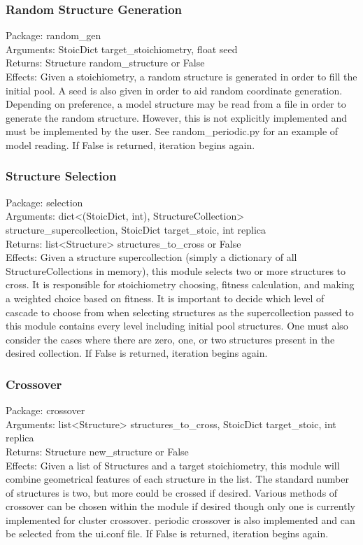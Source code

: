 		\subsubsection{Random Structure Generation} \vspace{-\baselineskip}
		Package: random\_gen\\
		Arguments: StoicDict target\_stoichiometry, float seed\\
		Returns: Structure random\_structure or False\\
		Effects: Given a stoichiometry, a random structure is generated in order to fill the initial pool. A seed is also given in order to aid random coordinate generation. Depending on preference, a model structure may be read from a file in order to generate the random structure. However, this is not explicitly implemented and must be implemented by the user. See random\_periodic.py for an example of model reading. If False is returned, iteration begins again.

		\subsubsection{Structure Selection} \vspace{-\baselineskip}
		Package: selection\\
		Arguments: dict<(StoicDict, int), StructureCollection> structure\_supercollection, StoicDict target\_stoic, int replica\\
		Returns: list<Structure> structures\_to\_cross or False\\
		Effects: Given a structure supercollection (simply a dictionary of all StructureCollections in memory), this module selects two or more structures to cross. It is responsible for stoichiometry choosing, fitness calculation, and making a weighted choice based on fitness. It is important to decide which level of cascade to choose from when selecting structures as the supercollection passed to this module contains every level including initial pool structures. One must also consider the cases where there are zero, one, or two structures present in the desired collection. If False is returned, iteration begins again.

		\subsubsection{Crossover} \vspace{-\baselineskip}
		Package: crossover\\
		Arguments: list<Structure> structures\_to\_cross, StoicDict target\_stoic, int replica\\
		Returns: Structure new\_structure or False\\
		Effects: Given a list of Structures and a target stoichiometry, this module will combine geometrical features of each structure in the list. The standard number of structures is two, but more could be crossed if desired. Various methods of crossover can be chosen within the module if desired though only one is currently implemented for cluster crossover. periodic crossover is also implemented and can be selected from the ui.conf file. If False is returned, iteration begins again.

